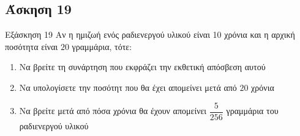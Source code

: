 \documentclass[greek]{beamer}
\begin{document}
\subsection{Άσκηση 19}
\begin{frame}[label=Άσκηση19,t]{Εξάσκηση 19}
  Αν η ημιζωή ενός ραδιενεργού υλικού είναι 10 χρόνια και η αρχική ποσότητα είναι $20$ γραμμάρια, τότε:
  \begin{enumerate}
    \item<1-> Να βρείτε τη συνάρτηση που εκφράζει την εκθετική απόσβεση αυτού
    \item<2-> Να υπολογίσετε την ποσότητ που θα έχει απομείνει μετά από $20$ χρόνια
    \item<3-> Να βρείτε μετά από πόσα χρόνια θα έχουν απομείνει $\dfrac{5}{256}$ γραμμάρια του ραδιενεργού υλικού
  \end{enumerate}

\end{frame}


%
%
%
%
%
%
%
\end{document}
